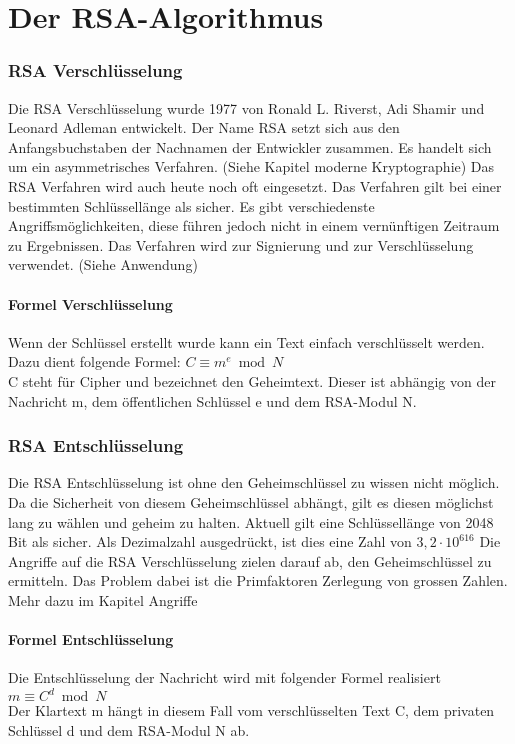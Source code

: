\part{Der RSA-Algorithmus}



\section{RSA Verschlüsselung}
Die RSA Verschlüsselung wurde 1977 von Ronald L. Riverst, Adi Shamir und Leonard Adleman entwickelt. Der Name RSA setzt sich aus den Anfangsbuchstaben der Nachnamen der Entwickler zusammen. Es handelt sich um ein asymmetrisches Verfahren. (Siehe Kapitel moderne Kryptographie) %
Das RSA Verfahren wird auch heute noch oft eingesetzt. Das Verfahren gilt bei einer bestimmten Schlüssellänge als sicher. Es gibt verschiedenste Angriffsmöglichkeiten, diese führen jedoch nicht in einem vernünftigen Zeitraum zu Ergebnissen. Das Verfahren wird zur Signierung und zur Verschlüsselung verwendet. (Siehe Anwendung) %

\subsection{Formel Verschlüsselung}
Wenn der Schlüssel erstellt wurde kann ein Text einfach verschlüsselt werden. Dazu dient folgende Formel:
$ C \equiv m^e  \bmod N $\\
C steht für Cipher und bezeichnet den Geheimtext. Dieser ist abhängig von der Nachricht m, dem öffentlichen Schlüssel e und dem RSA-Modul N.

\section{RSA Entschlüsselung}
Die RSA Entschlüsselung ist ohne den Geheimschlüssel zu wissen nicht möglich. Da die Sicherheit von diesem Geheimschlüssel abhängt, gilt es diesen möglichst lang zu wählen und geheim zu halten. Aktuell gilt eine Schlüssellänge von 2048 Bit als sicher. Als Dezimalzahl ausgedrückt, ist dies eine Zahl von $ 3,2 \cdot 10^{616} $
Die Angriffe auf die RSA Verschlüsselung zielen darauf ab, den Geheimschlüssel zu ermitteln. Das Problem dabei ist die Primfaktoren Zerlegung von grossen Zahlen. Mehr dazu im Kapitel Angriffe %

\subsection{Formel Entschlüsselung}
Die Entschlüsselung der Nachricht wird mit folgender Formel realisiert
$ m \equiv C^d \bmod N $ \\
Der Klartext m hängt in diesem Fall vom verschlüsselten Text C, dem privaten Schlüssel d und dem RSA-Modul N ab. 
%
%
